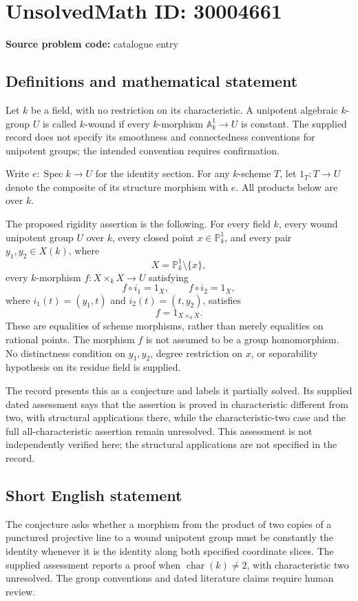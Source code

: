 \documentclass[11pt]{article}
\begin{document}
\section*{UnsolvedMath ID: 30004661}
\textbf{Source problem code:} catalogue entry
\subsection{Definitions and mathematical statement}
Let \(k\) be a field, with no restriction on its characteristic. A unipotent algebraic \(k\)-group \(U\) is called \(k\)-wound if every \(k\)-morphism \(\mathbb A_k^1\to U\) is constant. The supplied record does not specify its smoothness and connectedness conventions for unipotent groups; the intended convention requires confirmation.

Write \(e:\operatorname{Spec}k\to U\) for the identity section. For any \(k\)-scheme \(T\), let \(1_T:T\to U\) denote the composite of its structure morphism with \(e\). All products below are over \(k\).

The proposed rigidity assertion is the following. For every field \(k\), every wound unipotent group \(U\) over \(k\), every closed point \(x\in\mathbb P_k^1\), and every pair \(y_1,y_2\in X(k)\), where
\[
X=\mathbb P_k^1\setminus\{x\},
\]
every \(k\)-morphism \(f:X\times_k X\to U\) satisfying
\[
f\circ i_1=1_X,\qquad f\circ i_2=1_X,
\]
where \(i_1(t)=(y_1,t)\) and \(i_2(t)=(t,y_2)\), satisfies
\[
f=1_{X\times_k X}.
\]
These are equalities of scheme morphisms, rather than merely equalities on rational points. The morphism \(f\) is not assumed to be a group homomorphism. No distinctness condition on \(y_1,y_2\), degree restriction on \(x\), or separability hypothesis on its residue field is supplied.

The record presents this as a conjecture and labels it partially solved. Its supplied dated assessment says that the assertion is proved in characteristic different from two, with structural applications there, while the characteristic-two case and the full all-characteristic assertion remain unresolved. This assessment is not independently verified here; the structural applications are not specified in the record.
\subsection{Short English statement}
The conjecture asks whether a morphism from the product of two copies of a punctured projective line to a wound unipotent group must be constantly the identity whenever it is the identity along both specified coordinate slices. The supplied assessment reports a proof when \(\operatorname{char}(k)\ne 2\), with characteristic two unresolved. The group conventions and dated literature claims require human review.
\end{document}
